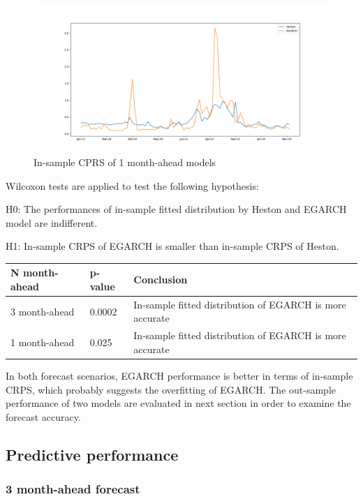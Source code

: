 \documentclass[12pt,a4paper]{article}
\numberwithin{equation}{section}
\begin{document}
\begin{figure}[h!] 
\includegraphics[scale=1,width=1\linewidth,height=0.4\textheight]{insample_crps_1m.png}
\caption{In-sample CPRS of 1 month-ahead models}
\label{3M_in}
\end{figure}

Wilcoxon tests are applied to test the following hypothesis:

H0: The performances of in-sample fitted distribution by Heston and EGARCH model are indifferent.

H1:  In-sample CRPS of EGARCH is smaller than in-sample CRPS of Heston.

\begin{table}[h!]
\centering
\begin{tabular}{@{}lll@{}}
\toprule
N month-ahead     & p-value & Conclusion                     \\ \midrule
3 month-ahead     & 0.0002  & In-sample fitted distribution of EGARCH is more accurate \\
1 month-ahead     & 0.025    & In-sample fitted distribution of EGARCH is more accurate \\ \bottomrule
\end{tabular}
\end{table}

In both forecast scenarios, EGARCH performance is better in terms of in-sample CRPS, which probably suggests the overfitting of EGARCH. The out-sample performance of two models are evaluated in next section in order to examine the forecast accuracy.

\subsection{Predictive performance}

\subsubsection{3 month-ahead forecast}
\end{document}
